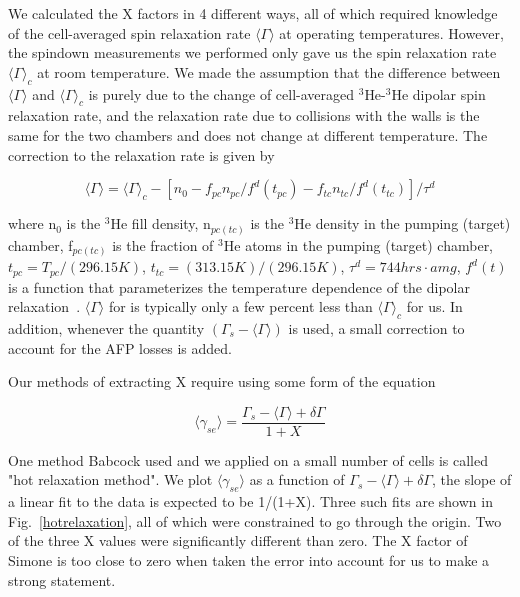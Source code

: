 We calculated the X factors in 4 different ways, all of which required knowledge of the cell-averaged spin relaxation rate $\langle \Gamma\rangle$ at operating temperatures. However, the spindown measurements we performed only gave us the spin relaxation rate $\langle \Gamma\rangle_{c}$ at room temperature. We made the assumption that the difference between $\langle \Gamma\rangle$ and $\langle \Gamma\rangle_{c}$ is purely due to the change of cell-averaged $^{3}$He-$^{3}$He dipolar spin relaxation rate, and the relaxation rate due to collisions with the walls is the same for the two chambers and does not change at different temperature. The correction to the relaxation rate is given by

\begin{equation}
\langle \Gamma\rangle=\langle \Gamma\rangle_{c}-[n_{0}-f_{pc}n_{pc}/f^{d}(t_{pc})- f_{tc}n_{tc}/f^{d}(t_{tc})]/\tau^{d}
\end{equation}

where n$_{0}$ is the $^{3}$He fill density, n$_{pc(tc)}$ is the $^{3}$He density in the pumping (target) chamber, f$_{pc(tc)}$ is the fraction of $^{3}$He atoms in the pumping (target) chamber, $t_{pc}=T_{pc}/(296.15 K)$, $t_{tc}=(313.15 K)/(296.15 K)$, $\tau^{d}=744 hrs\cdot amg$, $f^{d}(t)$ is a function that parameterizes the temperature dependence of the dipolar relaxation~\cite{JaideepThesis}. $\langle \Gamma\rangle$ for is typically only a few percent less than $\langle \Gamma\rangle_{c}$ for us. In addition, whenever the quantity $(\Gamma_{s}-\langle \Gamma\rangle)$ is used, a small correction to account for the AFP losses is added.

Our methods of extracting X require using some form of the equation

\begin{equation}\label{gammase}
\langle \gamma_{se}\rangle=\frac{\Gamma_{s}-\langle \Gamma\rangle+\delta\Gamma}{1+X}
\end{equation}

One method Babcock used and we applied on a small number of cells is called "hot relaxation method". We plot $\langle \gamma_{se}\rangle$ as a function of $\Gamma_s - \langle\Gamma\rangle + \delta\Gamma$, the slope of a linear fit to the data is expected to be 1/(1+X). Three such fits are shown in Fig.~\ref{hotrelaxation}, all of which were constrained to go through the origin. Two of the three X values were significantly different than zero. The X factor of Simone is too close to zero when taken the error into account for us to make a strong statement.

